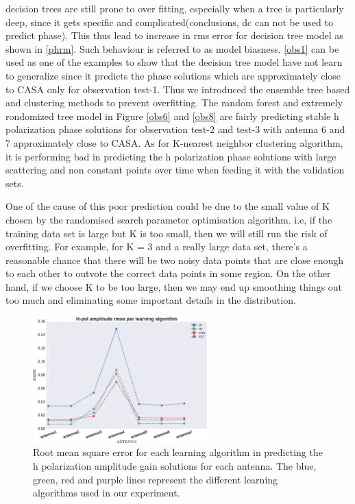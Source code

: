   decision trees are still prone to over fitting, especially when a tree is particularly deep, since it gets specific and complicated(conclusions, dc can not be used to predict phase).  This thus lead to increase in rms error for decision tree model as shown in \ref{phrm}. Such behaviour is referred to as model biasness. \ref{obs1} can be used as one of the examples to show that the decision tree model have not learn to generalize since it predicts the phase solutions which are approximately close to CASA only for observation test-1. Thus we introduced the ensemble tree based and clustering methods to prevent overfitting. The random forest and extremely rondomized tree model in Figure \ref{obs6} and \ref{obs8} are fairly predicting stable h polarization phase solutions for observation test-2 and test-3 with antenna 6 and 7 approximately close to CASA. As for K-nearest neighbor clustering algorithm, it is performing bad in predicting the h polarization phase solutions with large scattering and non constant points over time when feeding it with the validation sets. 
  
One of the cause of this poor prediction could be due to the small value of K chosen by the randomised search parameter optimisation algorithm. i.e, if the training data set is large but K is too small, then we will still run the risk of overfitting. For example, for K = 3 and a really large data set, there’s a reasonable chance that there will be two noisy data points that are close enough to each other to outvote the correct data points in some region. On the other hand, if we choose K to be too large, then we may end up smoothing things out too much and eliminating some important details in the distribution. 
\begin{figure}[H]
  \centering
    \includegraphics[width=0.6\textwidth]{images/Hpol-amp.eps}
    \caption{Root mean square error for each learning algorithm in predicting the h polarization amplitude gain solutions for each antenna. The blue, green, red and purple lines represent the different learning algorithms used in our experiment.}
  \label{amprm}
 \end{figure} 

